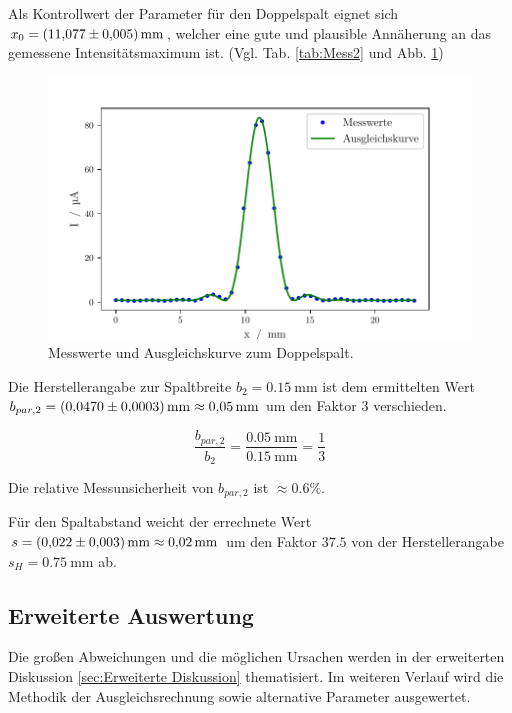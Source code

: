 Als Kontrollwert der Parameter für den Doppelspalt eignet sich $x_0 = \SI{11.077 \pm 0.005}{\milli\meter}$, welcher eine gute und plausible Annäherung an das gemessene Intensitätsmaximum ist. (Vgl. Tab. \ref{tab:Mess2} und Abb. \ref{fig:messDoppel})
\begin{figure}
    \centering
    \includegraphics[width=.9\textwidth]{python/DoppelspaltFit.pdf}
    \caption{Messwerte und Ausgleichskurve zum Doppelspalt.}
    \label{fig:messDoppel}
\end{figure}

Die Herstellerangabe zur Spaltbreite $b_2 = \SI{0.15}{\milli\meter}$ ist dem ermittelten Wert $b_{par, 2} = \SI{0.0470 \pm 0.0003}{\milli\meter} \approx \SI{0.05}{\milli\meter}$
um den Faktor $3$ verschieden.

\begin{equation}
    \frac{b_{par, 2}}{b_2} = \frac{\SI{0.05}{\milli\meter}}{\SI{0.15}{\milli\meter}} = \frac{1}{3}
\end{equation}

Die relative Messunsicherheit von $b_{par, 2}$ ist $\approx 0.6\%$.

Für den Spaltabstand weicht der errechnete Wert $s = \SI{0.022 \pm 0.003}{\milli\meter} \approx \SI{0.02}{\milli\meter}$ um den Faktor $37.5$ von der Herstellerangabe $s_H = \SI{0.75}{\milli\meter}$ ab.

\subsection{Erweiterte Auswertung}
Die großen Abweichungen und die möglichen Ursachen werden in der erweiterten Diskussion \ref{sec:Erweiterte Diskussion} thematisiert.
Im weiteren Verlauf wird die Methodik der Ausgleichsrechnung sowie alternative Parameter ausgewertet.\\

